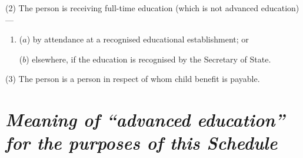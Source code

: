 \documentclass[12pt,a4paper]{article}
\begin{document}
(2) The person is receiving full-time education (which is not advanced education)—
\begin{enumerate}\item[]
($a$) by attendance at a recognised educational establishment; or

($b$) elsewhere, if the education is recognised by the Secretary of State.
\end{enumerate}

(3) The person is a person in respect of whom child benefit is payable.


%

\section*{\itshape Meaning of “advanced education” for the purposes of 
this Schedule%
}

%
\end{document}
